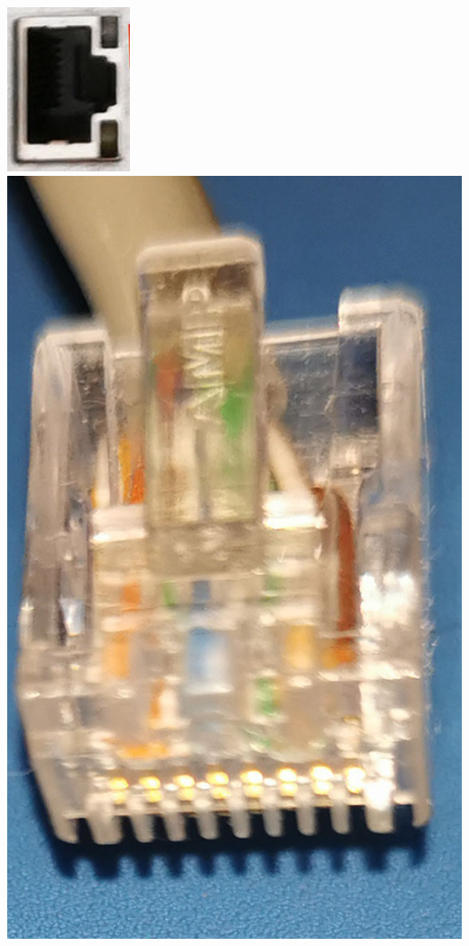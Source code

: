 \begin{center}
	\includegraphics[scale=0.5]{pic/RJ}\includegraphics[scale=0.2]{pic/RJL}
\end{center}\par
